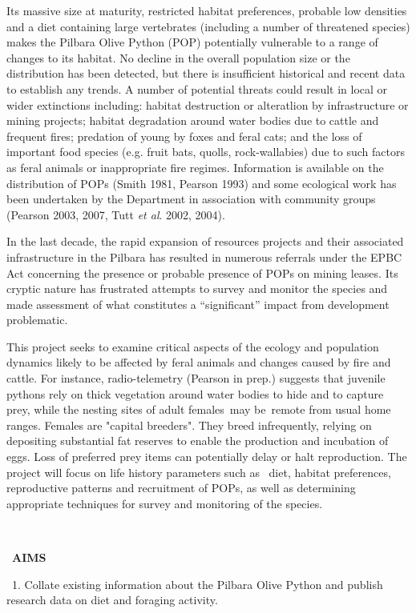 \documentclass[version=last,
    paper=a4,                               %
    10pt,                                   %
    dvipsnames,
    oneside,                              %
    headings=openany,                       %
    open=any,
    BCOR=7mm,                               %
    DIV=15,     %
]{scrbook}
\begin{document}
Its massive size at maturity, restricted habitat preferences, probable
low densities and a diet containing large vertebrates (including a
number of threatened species) makes the Pilbara Olive Python (POP)
potentially vulnerable to a range of changes to its habitat. No decline
in the overall population size or the distribution has been detected,
but there is insufficient historical and recent data to establish any
trends. A number of potential threats could result in local or wider
extinctions including: habitat destruction or alteratlion by
infrastructure or mining projects; habitat degradation around water
bodies due to cattle and frequent fires; predation of young by foxes and
feral cats; and the loss of important food species (e.g. fruit bats,
quolls, rock-wallabies) due to such factors as feral animals or
inappropriate fire regimes. Information is available on the distribution
of POPs (Smith 1981, Pearson 1993) and some ecological work has been
undertaken by the Department in association with community groups
(Pearson 2003, 2007, Tutt \emph{et al}. 2002, 2004).

In the last decade, the rapid expansion of resources projects and their
associated infrastructure in the Pilbara has resulted in numerous
referrals under the EPBC Act concerning the presence or probable
presence of POPs on mining leases. Its cryptic nature has frustrated
attempts to survey and monitor the species and made assessment of what
constitutes a ``significant'' impact from development problematic.~

This project seeks to examine critical aspects of the ecology and
population dynamics likely to be affected by feral animals and changes
caused by fire and cattle. For instance, radio-telemetry (Pearson in
prep.) suggests that juvenile pythons rely on thick vegetation around
water bodies to hide and to capture prey, while the nesting sites of
adult females~may be~remote from usual home ranges. Females are "capital
breeders". They breed infrequently, relying on depositing substantial
fat reserves to enable the production and incubation of eggs. Loss of
preferred prey items can potentially delay or halt reproduction. The
project will focus on life history parameters such as ~diet, habitat
preferences, reproductive patterns and recruitment of POPs, as well as
determining appropriate techniques for survey and monitoring of the
species.

~

~\textbf{AIMS}

~1. Collate existing information about the Pilbara Olive Python and
publish research data on diet and foraging activity.
\end{document}
